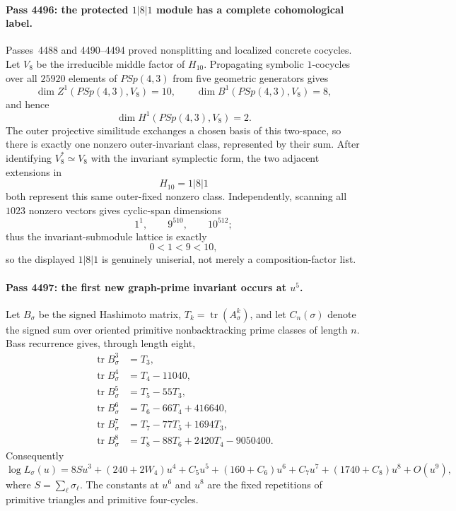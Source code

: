 \paragraph{Pass 4496: the protected $1|8|1$ module has a complete cohomological label.}
Passes~4488 and 4490--4494 proved nonsplitting and localized concrete cocycles.
Let $V_8$ be the irreducible middle factor of $H_{10}$.  Propagating symbolic
$1$-cocycles over all $25920$ elements of $PSp(4,3)$ from five geometric
generators gives
\[
  \dim Z^1(PSp(4,3),V_8)=10,
  \qquad
  \dim B^1(PSp(4,3),V_8)=8,
\]
and hence
\[
  \boxed{\dim H^1(PSp(4,3),V_8)=2.}
\]
The outer projective similitude exchanges a chosen basis of this two-space, so
there is exactly one nonzero outer-invariant class, represented by their sum.
After identifying $V_8^*\simeq V_8$ with the invariant symplectic form, the two
adjacent extensions in
\[
  H_{10}=1|8|1
\]
both represent this same outer-fixed nonzero class.  Independently, scanning all
$1023$ nonzero vectors gives cyclic-span dimensions
\[
  1^1,\qquad 9^{510},\qquad 10^{512};
\]
thus the invariant-submodule lattice is exactly
\[
  \boxed{0<1<9<10,}
\]
so the displayed $1|8|1$ is genuinely uniserial, not merely a composition-factor
list.

\paragraph{Pass 4497: the first new graph-prime invariant occurs at $u^5$.}
Let $B_\sigma$ be the signed Hashimoto matrix, $T_k=\operatorname{tr}(A_\sigma^k)$,
and let $C_n(\sigma)$ denote the signed sum over oriented primitive
nonbacktracking prime classes of length $n$.  Bass recurrence gives, through
length eight,
\begin{align*}
 \operatorname{tr}B_\sigma^3 &=T_3,\\
 \operatorname{tr}B_\sigma^4 &=T_4-11040,\\
 \operatorname{tr}B_\sigma^5 &=T_5-55T_3,\\
 \operatorname{tr}B_\sigma^6 &=T_6-66T_4+416640,\\
 \operatorname{tr}B_\sigma^7 &=T_7-77T_5+1694T_3,\\
 \operatorname{tr}B_\sigma^8 &=T_8-88T_6+2420T_4-9050400.
\end{align*}
Consequently
\[
 \boxed{\log L_\sigma(u)=8Su^3+(240+2W_4)u^4+C_5u^5
 +(160+C_6)u^6+C_7u^7+(1740+C_8)u^8+O(u^9),}
\]
where $S=\sum_\ell\sigma_\ell$.  The constants at $u^6$ and $u^8$ are the
fixed repetitions of primitive triangles and primitive four-cycles.

